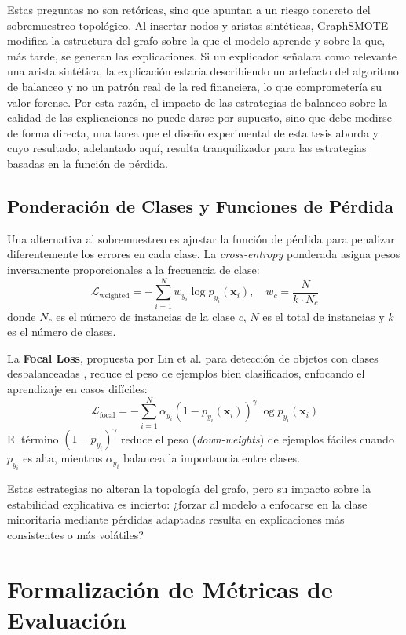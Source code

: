 Estas preguntas no son retóricas, sino que apuntan a un riesgo concreto del sobremuestreo topológico. Al insertar nodos y aristas sintéticas, GraphSMOTE modifica la estructura del grafo sobre la que el modelo aprende y sobre la que, más tarde, se generan las explicaciones. Si un explicador señalara como relevante una arista sintética, la explicación estaría describiendo un artefacto del algoritmo de balanceo y no un patrón real de la red financiera, lo que comprometería su valor forense. Por esta razón, el impacto de las estrategias de balanceo sobre la calidad de las explicaciones no puede darse por supuesto, sino que debe medirse de forma directa, una tarea que el diseño experimental de esta tesis aborda y cuyo resultado, adelantado aquí, resulta tranquilizador para las estrategias basadas en la función de pérdida.

\subsection{Ponderación de Clases y Funciones de Pérdida}

Una alternativa al sobremuestreo es ajustar la función de pérdida para penalizar diferentemente los errores en cada clase. La \textit{cross-entropy} ponderada asigna pesos inversamente proporcionales a la frecuencia de clase:
\[ \mathcal{L}_{\text{weighted}} = -\sum_{i=1}^{N} w_{y_i} \log p_{y_i}(\mathbf{x}_i), \quad w_c = \frac{N}{k \cdot N_c} \]
donde $N_c$ es el número de instancias de la clase $c$, $N$ es el total de instancias y $k$ es el número de clases.

La \textbf{Focal Loss}, propuesta por Lin et al. para detección de objetos con clases desbalanceadas \cite{Lin2017FocalDetection}, reduce el peso de ejemplos bien clasificados, enfocando el aprendizaje en casos difíciles:
\[ \mathcal{L}_{\text{focal}} = -\sum_{i=1}^{N} \alpha_{y_i} (1 - p_{y_i}(\mathbf{x}_i))^\gamma \log p_{y_i}(\mathbf{x}_i) \]
El término $(1 - p_{y_i})^\gamma$ reduce el peso (\textit{down-weights}) de ejemplos fáciles cuando $p_{y_i}$ es alta, mientras $\alpha_{y_i}$ balancea la importancia entre clases.

Estas estrategias no alteran la topología del grafo, pero su impacto sobre la estabilidad explicativa es incierto: ¿forzar al modelo a enfocarse en la clase minoritaria mediante pérdidas adaptadas resulta en explicaciones más consistentes o más volátiles?

\section{Formalización de Métricas de Evaluación}


